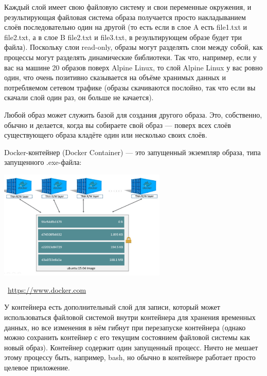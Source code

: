\documentclass[a5paper]{article}
\newcommand{\attribution}[1] {
    \vspace{-5mm}\begin{flushright}\begin{scriptsize}\textcolor{gray}{\textcopyright\, #1}\end{scriptsize}\end{flushright}
}
\begin{document}
Каждый слой имеет свою файловую систему и свои переменные окружения, и результирующая файловая система образа получается просто накладыванием слоёв последовательно один на другой (то есть если в слое A есть file1.txt и file2.txt, а в слое B file2.txt и file3.txt, в результирующем образе будет три файла). Поскольку слои read-only, образы могут разделять слои между собой, как процессы могут разделять динамические библиотеки. Так что, например, если у вас на машине 20 образов поверх Alpine Linux, то слой Alpine Linux у вас ровно один, что очень позитивно сказывается на объёме хранимых данных и потребляемом сетевом трафике (образы скачиваются послойно, так что если вы скачали слой один раз, он больше не качается).

Любой образ может служить базой для создания другого образа. Это, собственно, обычно и делается, когда вы собираете свой образ --- поверх всех слоёв существующего образа кладёте один или несколько своих слоёв.

Docker-контейнер (Docker Container) --- это запущенный экземпляр образа, типа запущенного .exe-файла:

\begin{center}
    \includegraphics[width=0.6\textwidth]{dockerContainer.png}
    \attribution{\url{ https://www.docker.com}}
\end{center}

У контейнера есть дополнительный слой для записи, который может использоваться файловой системой внутри контейнера для хранения временных данных, но все изменения в нём гибнут при перезапуске контейнера (однако можно сохранить контейнер с его текущим состоянием файловой системы как новый образ). Контейнер содержит один запущенный процесс. Ничто не мешает этому процессу быть, например, bash, но обычно в контейнере работает просто целевое приложение.
\end{document}
